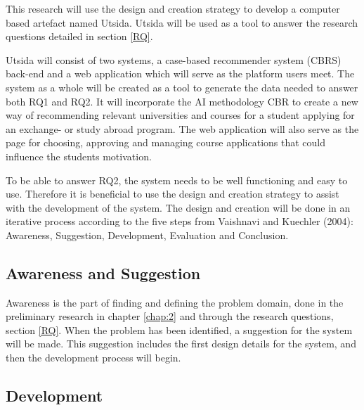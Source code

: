 This research will use the design and creation strategy to develop a computer based artefact named Utsida. Utsida will be used as a tool to answer the research questions detailed in section \ref{RQ}.   

Utsida will consist of two systems, a case-based recommender system (CBRS) back-end and a web application which will serve as the platform users meet. The system as a whole will be created as a tool to generate the data needed to answer both RQ1 and RQ2. It will incorporate the AI methodology CBR to create a new way of recommending relevant universities and courses for a student applying for an exchange- or study abroad program. The web application will also serve as the page for choosing, approving and managing course applications that could influence the students motivation.

To be able to answer RQ2, the system needs to be well functioning and easy to use. Therefore it is beneficial to use the design and creation strategy to assist with the development of the system. The design and creation will be done in an iterative process according to the five steps from Vaishnavi and Kuechler (2004)\cite{vaishnavi2004design}: Awareness, Suggestion, Development, Evaluation and Conclusion.

\subsection{Awareness and Suggestion}
Awareness is the part of finding and defining the problem domain, done in the preliminary research in chapter \ref{chap:2} and through the research questions, section \ref{RQ}. When the problem has been identified, a suggestion for the system will be made. This suggestion includes the first design details for the system, and then the development process will begin. 


\subsection{Development}

